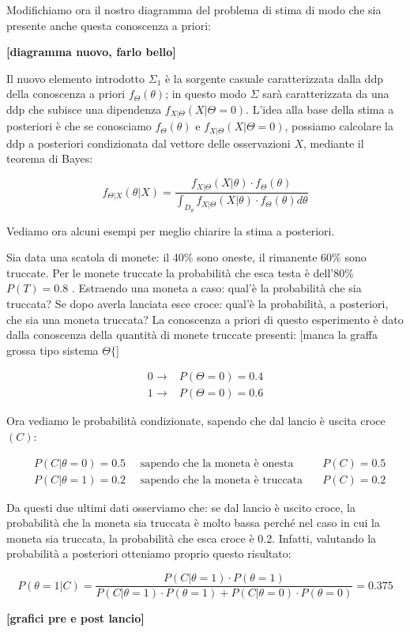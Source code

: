 Modifichiamo ora il nostro diagramma del problema di stima di modo che sia presente anche questa conoscenza a priori:

\begin{center}\textbf{[diagramma nuovo, farlo bello]}\end{center}

Il nuovo elemento introdotto $\Sigma_1$ è la sorgente casuale caratterizzata dalla ddp della conoscenza a priori $f_\Theta(\theta)$; in questo modo $\Sigma$ sarà caratterizzata da una ddp che subisce una dipendenza $f_{X|\Theta}(X|\Theta=0)$. L'idea alla base della stima a posteriori è che se conosciamo $f_{\Theta}(\theta)$ e $f_{X|\Theta}(X|\Theta=0)$, possiamo calcolare la ddp a posteriori  condizionata dal vettore delle osservazioni $X$, mediante il teorema di Bayes:

  \[ f_{\Theta|X}(\theta|X)=\frac{f_{X|\Theta}(X|\theta) \cdot f_\Theta(\theta)}{\int_{D_\theta}^{} f_{X|\Theta}(X|\theta) \cdot f_\Theta(\theta) d\theta } \]
  
Vediamo ora alcuni esempi per meglio chiarire la stima a posteriori.

\begin{esempio}
Sia data una scatola di monete: il 40\% sono oneste, il rimanente 60\% sono truccate. Per le monete truccate la probabilità che esca testa è dell'80\% $P(T)=0.8$ . Estraendo una moneta a caso: qual'è la probabilità che sia truccata? Se dopo averla lanciata esce croce: qual'è la probabilità, a posteriori, che sia una moneta truccata?\newline
La conoscenza a priori di questo esperimento è dato dalla conoscenza della quantità di monete truccate presenti:
[manca la graffa grossa tipo sistema $\Theta \{$]

  \begin{align*}
    0 \rightarrow &P(\Theta=0)=0.4 \\ 
    1 \rightarrow &P(\Theta=0)=0.6
  \end{align*}
  
Ora vediamo le probabilità condizionate, sapendo che dal lancio è uscita croce $(C)$:

  \begin{align*}
    &P(C|\theta=0)=0.5 \quad \text{ sapendo che la moneta è onesta}\quad &P(C)=0.5 \\
    &P(C|\theta=1)=0.2 \quad \text{ sapendo che la moneta è truccata}\quad &P(C)=0.2
  \end{align*}
  
Da questi due ultimi dati osserviamo che: se dal lancio è uscito croce, la probabilità che la moneta sia truccata è molto bassa perché nel caso in cui la moneta sia truccata, la probabilità che esca croce è 0.2. Infatti, valutando la probabilità a posteriori otteniamo proprio questo risultato:


    \[ P(\theta=1|C)=\frac{P(C|\theta=1) \cdot P(\theta=1)}{P(C|\theta=1) \cdot P(\theta=1) + P(C|\theta=0) \cdot P(\theta=0)}=0.375 \]

\textbf{[grafici pre e post lancio]}
\end{esempio}

